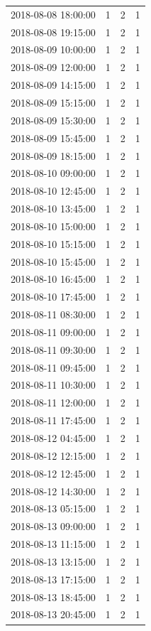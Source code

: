 \begin{tabular}{lrrr}
2018-08-08 18:00:00 & 1 & 2 & 1 \\
2018-08-08 19:15:00 & 1 & 2 & 1 \\
2018-08-09 10:00:00 & 1 & 2 & 1 \\
2018-08-09 12:00:00 & 1 & 2 & 1 \\
2018-08-09 14:15:00 & 1 & 2 & 1 \\
2018-08-09 15:15:00 & 1 & 2 & 1 \\
2018-08-09 15:30:00 & 1 & 2 & 1 \\
2018-08-09 15:45:00 & 1 & 2 & 1 \\
2018-08-09 18:15:00 & 1 & 2 & 1 \\
2018-08-10 09:00:00 & 1 & 2 & 1 \\
2018-08-10 12:45:00 & 1 & 2 & 1 \\
2018-08-10 13:45:00 & 1 & 2 & 1 \\
2018-08-10 15:00:00 & 1 & 2 & 1 \\
2018-08-10 15:15:00 & 1 & 2 & 1 \\
2018-08-10 15:45:00 & 1 & 2 & 1 \\
2018-08-10 16:45:00 & 1 & 2 & 1 \\
2018-08-10 17:45:00 & 1 & 2 & 1 \\
2018-08-11 08:30:00 & 1 & 2 & 1 \\
2018-08-11 09:00:00 & 1 & 2 & 1 \\
2018-08-11 09:30:00 & 1 & 2 & 1 \\
2018-08-11 09:45:00 & 1 & 2 & 1 \\
2018-08-11 10:30:00 & 1 & 2 & 1 \\
2018-08-11 12:00:00 & 1 & 2 & 1 \\
2018-08-11 17:45:00 & 1 & 2 & 1 \\
2018-08-12 04:45:00 & 1 & 2 & 1 \\
2018-08-12 12:15:00 & 1 & 2 & 1 \\
2018-08-12 12:45:00 & 1 & 2 & 1 \\
2018-08-12 14:30:00 & 1 & 2 & 1 \\
2018-08-13 05:15:00 & 1 & 2 & 1 \\
2018-08-13 09:00:00 & 1 & 2 & 1 \\
2018-08-13 11:15:00 & 1 & 2 & 1 \\
2018-08-13 13:15:00 & 1 & 2 & 1 \\
2018-08-13 17:15:00 & 1 & 2 & 1 \\
2018-08-13 18:45:00 & 1 & 2 & 1 \\
2018-08-13 20:45:00 & 1 & 2 & 1 \\

\end{tabular}
